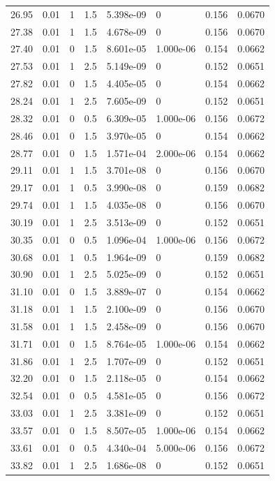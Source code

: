 \documentclass[preview]{standalone}
\begin{document}
{{{\begin{tabular}{L{1.2cm}C{1.2cm} C{0.3cm}C{0.5cm} C{1.4cm}C{1.4cm} C{1.4cm}C{1.4cm}}
  26.95  &  0.01  & 1     & 1.5 &  5.398e-09  & 0  & 0.156 &  0.0670   \\ 
  27.38  &  0.01  & 1     & 1.5 &  4.678e-09  & 0  & 0.156 &  0.0670   \\ 
  27.40  &  0.01  & 0     & 1.5 &  8.601e-05  & 1.000e-06  & 0.154 &  0.0662   \\ 
  27.53  &  0.01  & 1     & 2.5 &  5.149e-09  & 0  & 0.152 &  0.0651   \\ 
  27.82  &  0.01  & 0     & 1.5 &  4.405e-05  & 0  & 0.154 &  0.0662   \\ 
  28.24  &  0.01  & 1     & 2.5 &  7.605e-09  & 0  & 0.152 &  0.0651   \\ 
  28.32  &  0.01  & 0     & 0.5 &  6.309e-05  & 1.000e-06  & 0.156 &  0.0672   \\ 
  28.46  &  0.01  & 0     & 1.5 &  3.970e-05  & 0  & 0.154 &  0.0662   \\ 
  28.77  &  0.01  & 0     & 1.5 &  1.571e-04  & 2.000e-06  & 0.154 &  0.0662   \\ 
  29.11  &  0.01  & 1     & 1.5 &  3.701e-08  & 0  & 0.156 &  0.0670   \\ 
  29.17  &  0.01  & 1     & 0.5 &  3.990e-08  & 0  & 0.159 &  0.0682   \\ 
  29.74  &  0.01  & 1     & 1.5 &  4.035e-08  & 0  & 0.156 &  0.0670   \\ 
  30.19  &  0.01  & 1     & 2.5 &  3.513e-09  & 0  & 0.152 &  0.0651   \\ 
  30.35  &  0.01  & 0     & 0.5 &  1.096e-04  & 1.000e-06  & 0.156 &  0.0672   \\ 
  30.68  &  0.01  & 1     & 0.5 &  1.964e-09  & 0  & 0.159 &  0.0682   \\ 
  30.90  &  0.01  & 1     & 2.5 &  5.025e-09  & 0  & 0.152 &  0.0651   \\ 
  31.10  &  0.01  & 0     & 1.5 &  3.889e-07  & 0  & 0.154 &  0.0662   \\ 
  31.18  &  0.01  & 1     & 1.5 &  2.100e-09  & 0  & 0.156 &  0.0670   \\ 
  31.58  &  0.01  & 1     & 1.5 &  2.458e-09  & 0  & 0.156 &  0.0670   \\ 
  31.71  &  0.01  & 0     & 1.5 &  8.764e-05  & 1.000e-06  & 0.154 &  0.0662   \\ 
  31.86  &  0.01  & 1     & 2.5 &  1.707e-09  & 0  & 0.152 &  0.0651   \\ 
  32.20  &  0.01  & 0     & 1.5 &  2.118e-05  & 0  & 0.154 &  0.0662   \\ 
  32.54  &  0.01  & 0     & 0.5 &  4.581e-05  & 0  & 0.156 &  0.0672   \\ 
  33.03  &  0.01  & 1     & 2.5 &  3.381e-09  & 0  & 0.152 &  0.0651   \\ 
  33.57  &  0.01  & 0     & 1.5 &  8.507e-05  & 1.000e-06  & 0.154 &  0.0662   \\ 
  33.61  &  0.01  & 0     & 0.5 &  4.340e-04  & 5.000e-06  & 0.156 &  0.0672   \\ 
  33.82  &  0.01  & 1     & 2.5 &  1.686e-08  & 0  & 0.152 &  0.0651   \\ 
\hline 
\end{tabular} 

}}}
\end{document}
